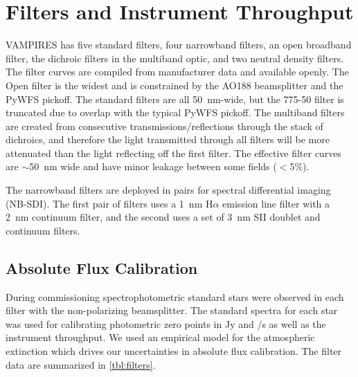 \section{Filters and Instrument Throughput}\label{sec:filters}

VAMPIRES has five standard filters, four narrowband filters, an open broadband filter, the dichroic filters in the multiband optic, and two neutral density filters. The filter curves are compiled from manufacturer data and available openly. The Open filter is the widest and is constrained by the AO188 beamsplitter and the PyWFS pickoff. The standard filters are all \SI{50}{\nm}-wide, but the 775-50 filter is truncated due to overlap with the typical PyWFS pickoff. The multiband filters are created from consecutive transmissions/reflections through the stack of dichroics, and therefore the light transmitted through all filters will be more attenuated than the light reflecting off the first filter. The effective filter curves are $\sim$\SI{50}{\nm} wide and have minor leakage between some fields ($<$5\%).

The narrowband filters are deployed in pairs for spectral differential imaging (NB-SDI). The first pair of filters uses a \SI{1}{\nm} H$\alpha$ emission line filter with a \SI{2}{\nm} continuum filter, and the second uses a set of \SI{3}{\nm} SII doublet and continuum filters.

\subsection{Absolute Flux Calibration}

During commissioning spectrophotometric standard stars were observed in each filter with the non-polarizing beamsplitter. The standard spectra for each star was used for calibrating photometric zero points in \si{Jy} and \si{\electron/\second} as well as the instrument throughput. We used an empirical model for the atmospheric extinction \citep{buton_atmospheric_2013} which drives our uncertainties in absolute flux calibration. The filter data are summarized in \autoref{tbl:filters}.

